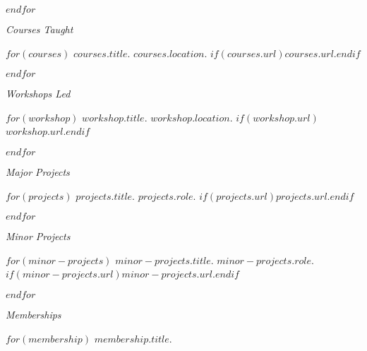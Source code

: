 \documentclass[11pt,article,oneside]{memoir}
\begin{document}
$endfor$

\bigskip
\pagebreak[1]


\ind \emph{Courses Taught}

\smallskip

$for(courses)$
\ind $courses.title$. $courses.location$. $if(courses.url)$\href{$courses.url$}{$courses.url$}.$endif$

\smallskip

$endfor$
\medskip

\ind \emph{Workshops Led}

\smallskip

$for(workshop)$
\ind $workshop.title$. $workshop.location$. $if(workshop.url)$\href{$workshop.url$}{$workshop.url$}.$endif$

\smallskip

$endfor$

\bigskip
\pagebreak[1]


\ind \emph{Major Projects}

\smallskip

$for(projects)$
\ind \emph{$projects.title$}. $projects.role$. $if(projects.url)$\href{$projects.url$}{$projects.url$}.$endif$

\smallskip
$endfor$

\medskip

\ind \emph{Minor Projects}

\smallskip

$for(minor-projects)$
\ind \emph{$minor-projects.title$}. $minor-projects.role$. $if(minor-projects.url)$\href{$minor-projects.url$}{$minor-projects.url$}.$endif$
\smallskip

$endfor$

\bigskip
\pagebreak[1]


\ind \emph{Memberships}

\smallskip

$for(membership)$
\ind $membership.title$.
\end{document}
